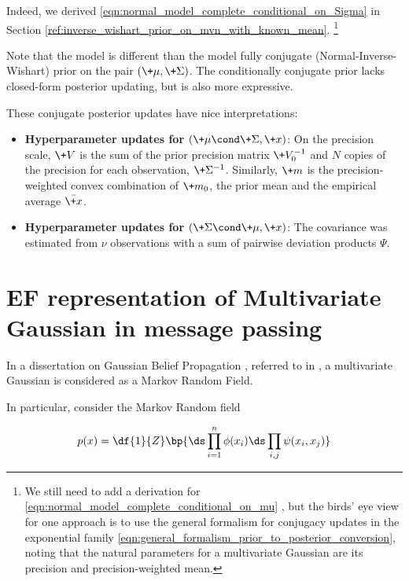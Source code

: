 \documentclass{article} %
\newcommand{\selfpotential}{\phi}
\newcommand{\edgepotential}{\psi}
\begin{document}
Indeed,  we derived \eqref{eqn:normal_model_complete_conditional_on_Sigma} in Section \ref{ref:inverse_wishart_prior_on_mvn_with_known_mean}. \footnote{We still need to add a derivation for \eqref{eqn:normal_model_complete_conditional_on_mu} ,  but the birds' eye view for one approach is to use the general formalism for conjugacy updates in the exponential family \eqref{eqn:general_formalism_prior_to_posterior_conversion},  noting that the natural parameters for a multivariate Gaussian are its precision and precision-weighted mean. }

Note that the model is different than the model  fully conjugate (Normal-Inverse-Wishart) prior on the pair $(\+\mu, \+\Sigma)$.   The conditionally conjugate prior lacks closed-form posterior updating,  but is also more expressive. 


These conjugate posterior updates have nice interpretations:
\begin{itemize}
\item \textbf{Hyperparameter updates for $(\+\mu  \cond \+\Sigma, \+x)$}: On the precision scale,  $\+V$ is the sum of the prior precision matrix $\+V_0^{-1}$ and $N$ copies of the precision for each observation,  $\+\Sigma^{-1}$.    Similarly,  $\+m$ is the precision-weighted convex combination of $\+m_0$, the prior mean    and the empirical average $\bar{\+x}$.
\item \textbf{Hyperparameter updates for $(\+\Sigma \cond \+\mu,  \+x)$}:  The covariance was estimated from $\nu$ observations with a sum of pairwise deviation products $\Psi$.
\end{itemize}


\newpage 
 \appendix
 
 \section{EF representation of Multivariate Gaussian in message passing}
 \label{sec:mvn_in_message_passing}
 
In a dissertation on Gaussian Belief Propagation \cite{bickson2008gaussian}, referred to in \cite{krishnan2016structured}, a multivariate Gaussian is considered as a Markov Random Field. 

In particular, consider the Markov Random field

\begin{equation}
p(x) = \df{1}{Z}\bp{ \ds\prod_{i=1}^n \selfpotential(x_i) \ds\prod_{i,j} \edgepotential(x_i, x_j)  } 
\label{eqn:mrf_dyadic}
\end{equation}
\end{document}
